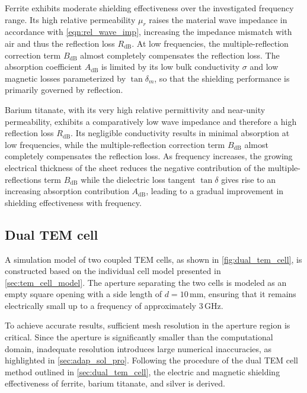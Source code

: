 Ferrite exhibits moderate shielding effectiveness over the investigated frequency range. 
Its high relative permeability $\mu_r$ raises the material wave impedance in accordance 
with \eqref{eqn:rel_wave_imp}, increasing the impedance mismatch with air and thus the 
reflection loss $R_\mathrm{dB}$. At low frequencies, the multiple-reflection correction 
term $B_\mathrm{dB}$ almost completely compensates the reflection loss. The absorption 
coefficient $A_\mathrm{dB}$ is limited by its low bulk conductivity $\sigma$ and low magnetic 
losses parameterized by $\tan\delta_m$, so that the shielding performance is primarily 
governed by reflection.

Barium titanate, with its very high relative permittivity and near-unity permeability, 
exhibits a comparatively low wave impedance and therefore a high reflection loss 
$R_\mathrm{dB}$. Its negligible conductivity results in minimal absorption at low 
frequencies, while the multiple-reflection correction term $B_\mathrm{dB}$ almost 
completely compensates the reflection loss. As frequency increases, the growing 
electrical thickness of the sheet reduces the negative contribution of the 
multiple-reflections term $B_\mathrm{dB}$ while the dielectric loss tangent $\tan\delta$ 
gives rise to an increasing absorption contribution $A_\mathrm{dB}$, leading to a 
gradual improvement in shielding effectiveness with frequency.


\subsection{Dual TEM cell}\label{sec:dual-tem-sim}

A simulation model of two coupled TEM cells, as shown in \autoref{fig:dual_tem_cell}, 
is constructed based on the individual cell model presented in \cref{sec:tem_cell_model}. 
The aperture separating the two cells is modeled as an empty square opening with a side 
length of $d=10\,\mathrm{mm}$, ensuring that it remains electrically small up to a 
frequency of approximately $3\,\mathrm{GHz}$. 

To achieve accurate results, sufficient mesh resolution in the aperture region 
is critical. Since the aperture is significantly smaller than the computational 
domain, inadequate resolution introduces large numerical inaccuracies, as 
highlighted in \cref{sec:adap_sol_pro}. Following the procedure of the dual TEM cell method outlined in \cref{sec:dual_tem_cell}, the 
electric and magnetic shielding effectiveness of ferrite, barium titanate, and silver 
is derived.

